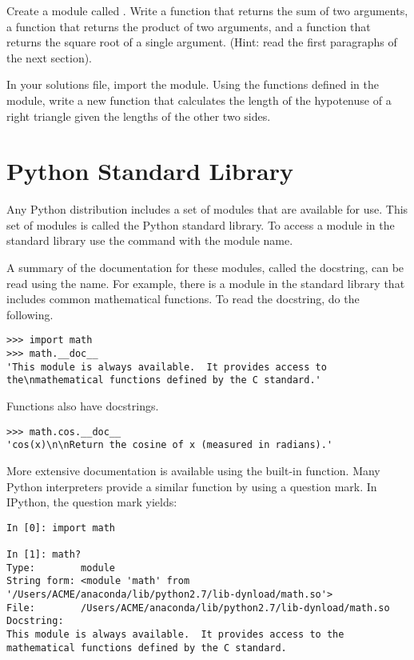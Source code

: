 \begin{problem}
Create a module called .
Write a function that returns the sum of two arguments, a function that returns the product of two arguments, and a function that returns the square root of a single argument.
(Hint: read the first paragraphs of the next section).

In your solutions file, import the  module.
Using the functions defined in the module, write a new function that calculates the length of the hypotenuse of a right triangle given the lengths of the other two sides.
\end{problem}

\section*{Python Standard Library}

Any Python distribution includes a set of modules that are available for use.
This set of modules is called the Python standard library.
To access a module in the standard library use the  command with the module name.

A summary of the documentation for these modules, called the docstring, can be read using the  name.
For example, there is a  module in the standard library that includes common mathematical functions.
To read the docstring, do the following.
\begin{lstlisting}
>>> import math
>>> math.__doc__
'This module is always available.  It provides access to the\nmathematical functions defined by the C standard.'
\end{lstlisting}
Functions also have docstrings.
\begin{lstlisting}
>>> math.cos.__doc__
'cos(x)\n\nReturn the cosine of x (measured in radians).'
\end{lstlisting}

More extensive documentation is available using the  built-in function.
Many Python interpreters provide a similar function by using a question mark.
In IPython, the question mark yields:

\begin{lstlisting}
In [0]: import math

In [1]: math?
Type:        module
String form: <module 'math' from '/Users/ACME/anaconda/lib/python2.7/lib-dynload/math.so'>
File:        /Users/ACME/anaconda/lib/python2.7/lib-dynload/math.so
Docstring:
This module is always available.  It provides access to the
mathematical functions defined by the C standard.
\end{lstlisting}

